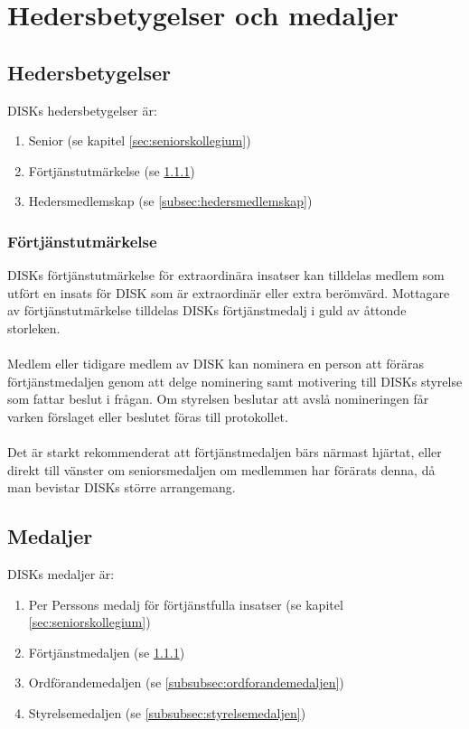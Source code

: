 \clearpage


\section{Hedersbetygelser och medaljer}
\label{sec:hedersbetygelserochmedaljer}

	\subsection{Hedersbetygelser}
	\label{subsec:hedersbetygelser}
		DISKs hedersbetygelser är:
		\begin{enumerate}
		\setlength{\itemsep}{0.0cm}
		\setlength{\parskip}{0.0cm}
			\item Senior (se kapitel \ref{sec:seniorskollegium})
			\item Förtjänstutmärkelse (se \ref{subsubsec:fortjanstutmarkelse})
			\item Hedersmedlemskap (se \ref{subsec:hedersmedlemskap})
		\end{enumerate}

	\subsubsection{Förtjänstutmärkelse}
	\label{subsubsec:fortjanstutmarkelse}
		DISKs förtjänstutmärkelse för extraordinära insatser kan tilldelas medlem som utfört en insats för DISK som är extraordinär eller extra berömvärd. Mottagare av förtjänstutmärkelse tilldelas DISKs förtjänstmedalj i guld av åttonde storleken.\\ \\
		Medlem eller tidigare medlem av DISK kan nominera en person att föräras förtjänstmedaljen genom att delge nominering samt motivering till DISKs styrelse som fattar beslut i frågan. Om styrelsen beslutar att avslå nomineringen får varken förslaget eller beslutet föras till protokollet.\\ \\
		Det är starkt rekommenderat att förtjänstmedaljen bärs närmast hjärtat, eller direkt till vänster om seniorsmedaljen om medlemmen har förärats denna, då man bevistar DISKs större arrangemang.

	\subsection{Medaljer}
	\label{subsec:medaljer}
		DISKs medaljer är:
		\begin{enumerate}
		\setlength{\itemsep}{0.0cm}
		\setlength{\parskip}{0.0cm}
			\item Per Perssons medalj för förtjänstfulla insatser (se kapitel \ref{sec:seniorskollegium})
			\item Förtjänstmedaljen (se \ref{subsubsec:fortjanstutmarkelse})
			\item Ordförandemedaljen (se \ref{subsubsec:ordforandemedaljen})
			\item Styrelsemedaljen (se \ref{subsubsec:styrelsemedaljen})
		\end{enumerate}

